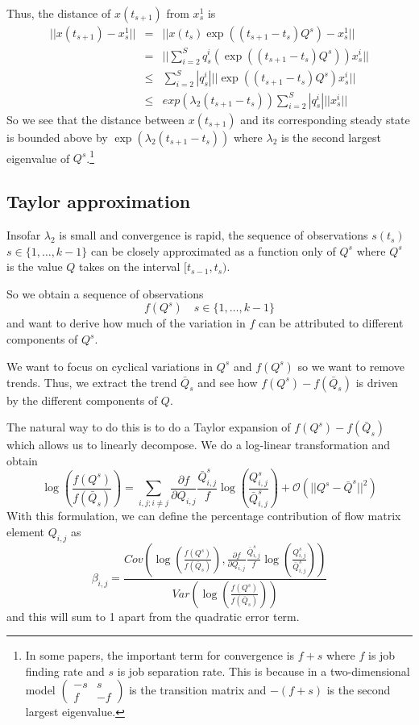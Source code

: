 Thus, the distance of $x(t_{s+1})$ from $x_s^1$ is 
\begin{eqnarray*}
||x(t_{s+1})-x_s^1|| &=& ||x(t_s)\exp((t_{s+1}-t_s)Q^s)-x_s^1||\\
&=& ||\sum_{i=2}^S q^i_s \left(\exp((t_{s+1}-t_s)Q^s)\right) x_s^i||\\
&\le& \sum_{i=2}^S |q^i_s| ||\exp((t_{s+1}-t_s)Q^s)x_s^i||\\
&\le& exp(\lambda_2 (t_{s+1}-t_s)) \sum_{i=2}^S |q^i_s| ||x_s^i||
\end{eqnarray*}
So we see that the distance between $x(t_{s+1})$ and its corresponding steady state is bounded above by $\exp(\lambda_2(t_{s+1}-t_s))$ where $\lambda_2$ is the second largest eigenvalue of $Q^s$.\footnote{In some papers, the important term for convergence is $f+s$ where $f$ is job finding rate and $s$ is job separation rate. This is because in a two-dimensional model $\left(\begin{array}{cc} -s & s \\ f & -f\end{array}\right)$ is the transition matrix and $-(f+s)$ is the second largest eigenvalue.}

\subsection{Taylor approximation}
Insofar $\lambda_2$ is small and convergence is rapid, the sequence of observations $s(t_s)$ $s\in\{1,\dots,k-1\}$ can be closely approximated as a function only of $Q^s$ where $Q^s$ is the value $Q$ takes on the interval $[t_{s-1},t_s)$. 

So we obtain a sequence of observations 
\[
f(Q^s) \quad s\in \{1,\dots,k-1\}
\]
and want to derive how much of the variation in $f$ can be attributed to different components of $Q^s$.

We want to focus on cyclical variations in $Q^s$ and $f(Q^s)$ so we want to remove trends. Thus, we extract the trend $\bar{Q}_s$ and see how $f(Q^s)-f(\bar{Q}_s)$ is driven by the different components of $Q$. 

The natural way to do this is to do a Taylor expansion of $f(Q^s)-f(\bar{Q}_s)$ which allows us to linearly decompose. We do a log-linear transformation and obtain
\[
\log\left(\frac{f(Q^s)}{f(\bar{Q}_s)}\right) = \sum_{i,j; i\neq j} \frac{\partial f}{\partial Q_{i,j}}\frac{\bar{Q}^s_{i,j}}{f}\log\left(\frac{{Q}^s_{i,j}}{\bar{Q}^s_{i,j}}\right)+\mathcal{O}\left(||Q^s-\bar{Q}^s||^2\right)
\]
With this formulation, we can define the percentage contribution of flow matrix element $Q_{i,j}$ as 
\[
\beta_{i,j} = \frac{Cov\left(\log\left(\frac{f(Q^s)}{f(\bar{Q}_s)}\right), \frac{\partial f}{\partial Q_{i,j}}\frac{\bar{Q}^s_{i,j}}{f}\log\left(\frac{{Q}^s_{i,j}}{\bar{Q}^s_{i,j}}\right)\right)}{Var\left(\log\left(\frac{f(Q^s)}{f(\bar{Q}_s)}\right)\right)}
\]
and this will sum to 1 apart from the quadratic error term.


